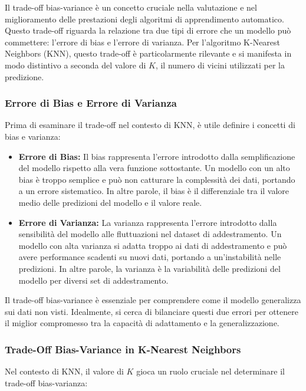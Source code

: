 Il trade-off bias-variance è un concetto cruciale nella valutazione e nel miglioramento delle prestazioni degli algoritmi di apprendimento automatico. Questo trade-off riguarda la relazione tra due tipi di errore che un modello può commettere: l'errore di bias e l'errore di varianza. Per l'algoritmo K-Nearest Neighbors (KNN), questo trade-off è particolarmente rilevante e si manifesta in modo distintivo a seconda del valore di \( K \), il numero di vicini utilizzati per la predizione.

\subsubsection{Errore di Bias e Errore di Varianza}

Prima di esaminare il trade-off nel contesto di KNN, è utile definire i concetti di bias e varianza:

\begin{itemize}
    \item \textbf{Errore di Bias:} Il bias rappresenta l'errore introdotto dalla semplificazione del modello rispetto alla vera funzione sottostante. Un modello con un alto bias è troppo semplice e può non catturare la complessità dei dati, portando a un errore sistematico. In altre parole, il bias è il differenziale tra il valore medio delle predizioni del modello e il valore reale.

    \item \textbf{Errore di Varianza:} La varianza rappresenta l'errore introdotto dalla sensibilità del modello alle fluttuazioni nel dataset di addestramento. Un modello con alta varianza si adatta troppo ai dati di addestramento e può avere performance scadenti su nuovi dati, portando a un'instabilità nelle predizioni. In altre parole, la varianza è la variabilità delle predizioni del modello per diversi set di addestramento.
\end{itemize}

Il trade-off bias-variance è essenziale per comprendere come il modello generalizza sui dati non visti. Idealmente, si cerca di bilanciare questi due errori per ottenere il miglior compromesso tra la capacità di adattamento e la generalizzazione.

\subsubsection{Trade-Off Bias-Variance in K-Nearest Neighbors}

Nel contesto di KNN, il valore di \( K \) gioca un ruolo cruciale nel determinare il trade-off bias-varianza:

